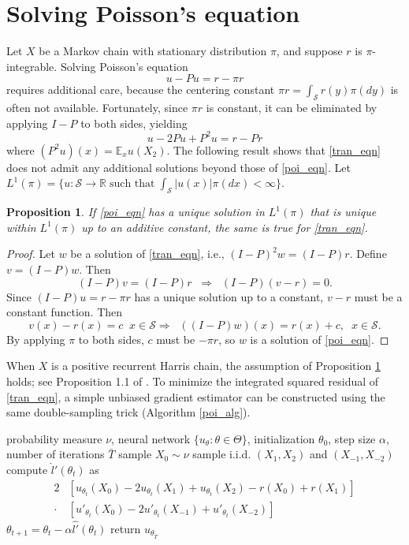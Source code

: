 \documentclass[pdflatex,sn-mathphys-ay]{sn-jnl}%
\numberwithin{equation}{section}
\newcommand\sbk[1]{\left[#1\right]}
\newcommand{\E}{\mathbb{E}}
\newcommand{\Scal}{\mathcal{S}}
\newcommand{\R}{\mathbb{R}}
\theoremstyle{thmstyleone}%
\newtheorem{proposition}[theorem]{Proposition}%
\theoremstyle{thmstyletwo}%
\theoremstyle{thmstylethree}%
\begin{document}
\section{Solving Poisson's equation}
\label{poisson_section}
Let $X$ be a Markov chain with stationary distribution $\pi$, and suppose $r$ is $\pi$-integrable. Solving Poisson's equation 
\begin{equation}
\label{poi_eqn}
    u-Pu=r-\pi r
\end{equation} 
requires additional care, because the centering constant $\pi r=\int_\Scal r(y)\pi(dy)$ is often not available. Fortunately, since $\pi r$ is constant, it can be eliminated by applying $I-P$ to both sides, yielding
\begin{equation}
\label{tran_eqn}
u-2Pu+P^2u=r-Pr
\end{equation}
where $(P^2u)(x)=\E_xu(X_2)$. The following result shows that \eqref{tran_eqn} does not admit any additional solutions beyond those of \eqref{poi_eqn}.
Let $L^1(\pi)=\{u:\Scal\rightarrow\R\;\text{such that}\;\int_\Scal|u(x)|\pi(dx)<\infty\}$. 
\begin{proposition}
\label{poi_prop}
If \eqref{poi_eqn} has a unique solution in $L^1(\pi)$ that is unique within $L^1(\pi)$ up to an additive constant, the same is true for \eqref{tran_eqn}.
\end{proposition}
\begin{proof}
    Let $w$ be a solution of \eqref{tran_eqn}, i.e., $(I-P)^2w=(I-P)r$. Define $v=(I-P)w$. Then
    \[
    (I-P)v=(I-P)r\;\;\Rightarrow\;\;(I-P)(v-r)=0.
    \]
    Since $(I-P)u=r-\pi r$ has a unique solution up to a constant, $v-r$ must be a constant function.
    Then
    \[
    v(x)-r(x)=c\;\;x\in\Scal\Rightarrow\;\;((I-P)w)(x)=r(x)+c,\;\;x\in\Scal.
    \]
    By applying $\pi$ to both sides, $c$ must be $-\pi r$, so $w$ is a solution of \eqref{poi_eqn}.
\end{proof}
When $X$ is a positive recurrent Harris chain, the assumption of Proposition \ref{poi_prop} holds; see Proposition 1.1 of \cite{glynn1996liapounov}.
To minimize the integrated squared residual of \eqref{tran_eqn}, a simple unbiased gradient estimator can be constructed using the same double-sampling trick (Algorithm \ref{poi_alg}).
\begin{algorithm}
\caption{Poisson RGA}\label{poi_alg}
\begin{algorithmic}
\Require probability measure $\nu$, neural network $\{u_\theta:\theta\in\Theta\}$, initialization $\theta_0$, step size $\alpha$, number of iterations $\bar{T}$
\State sample $X_0\sim\nu$
\State sample i.i.d. $(X_1,X_2)$ and $(X_{-1},X_{-2})$
\State compute $\hat{l}'(\theta_t)$ as
\begin{align*}
    2&\sbk{u_{\theta_t}(X_0)-2u_{\theta_t}(X_1)+u_{\theta_t}(X_2)-r(X_0)+r(X_1)}\\
    \cdot&\sbk{u'_{\theta_t}(X_0)-2u'_{\theta_t}(X_{-1})+u'_{\theta_t}(X_{-2})}
\end{align*}
\State $\theta_{t+1}=\theta_t-\alpha\hat{l'}(\theta_t)$
\EndFor
\State return $u_{\theta_{\bar{T}}}$
\end{algorithmic}
\end{algorithm}
\end{document}
